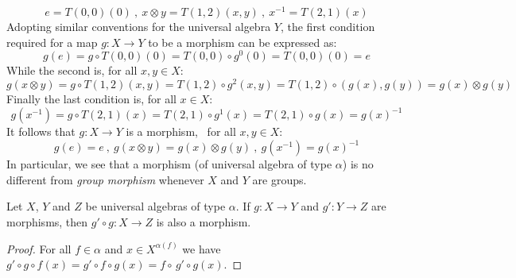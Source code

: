     \[
        e=T(0,0)(0)\ ,\  x\otimes y=T(1,2)(x,y)\ ,\ x^{-1}=T(2,1)(x)
    \]
Adopting similar conventions for the universal algebra $Y$, the
first condition required for a map $g:X\to Y$ to be a morphism can
be expressed as:
    \[
    g(e) = g\circ T(0,0)(0) = T(0,0)\circ g^{0}(0) = T(0,0)(0) = e
    \]
While the second is, for all $x,y\in X$:
    \[
    g(x\otimes y) = g\circ T(1,2)(x,y) = T(1,2)\circ g^{2}(x,y) = T(1,2)\circ (g(x),g(y))=g(x)\otimes g(y)
    \]
Finally the last condition is, for all $x\in X$:
    \[
    g(x^{-1}) = g\circ T(2,1)(x)= T(2,1)\circ g^{1}(x) = T(2,1)\circ g(x) = g(x)^{-1}
    \]
It follows that $g:X\to Y$ is a morphism, \ifand\ for all $x,y\in X$:
    \[
    g(e)=e\ ,\ g(x\otimes y)=g(x)\otimes g(y)\ ,\ g(x^{-1})=g(x)^{-1}
    \]
In particular, we see that a morphism (of universal algebra of type
$\alpha$) is no different from {\em group morphism} whenever $X$ and
$Y$ are groups.
\begin{prop}
Let $X$, $Y$ and $Z$ be universal algebras of type $\alpha$. If
$g:X\to Y$ and $g':Y\to Z$ are morphisms, then $g'\circ g:X\to Z$ is
also a morphism.
\end{prop}
\begin{proof}
For all $f\in\alpha$ and $x\in X^{\alpha(f)}$ we have $g'\circ
g\circ f(x)=g'\circ f\circ g(x)=f\circ\, g'\circ g(x)$.
\end{proof}
